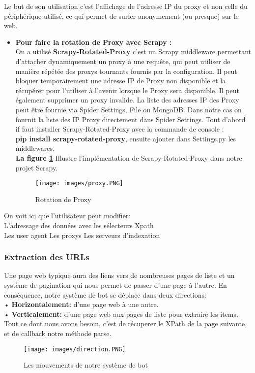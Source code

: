 Le but de son utilisation c'est l'affichage de l'adresse IP du proxy et non celle du périphérique utilisé, ce qui permet de surfer anonymement (ou presque) sur le web.
\newpage
\begin{itemize}[label=,font=\normalsize]
    \addtolength{\itemindent}{0cm}
    \item\textbf{Pour faire la rotation de Proxy avec Scrapy : }\\  
On a utilisé \textbf{Scrapy-Rotated-Proxy} c'est un Scrapy middleware permettant d'attacher dynamiquement un proxy à une requête, qui peut utiliser de manière répétée des proxys tournants fournis par la configuration. Il peut bloquer temporairement une adresse IP de Proxy non disponible et la récupérer pour l'utiliser à l'avenir lorsque le Proxy sera disponible. Il peut également supprimer un proxy invalide. La liste des adresses IP des Proxy peut être fournie via Spider Settings, File ou MongoDB.
Dans notre cas on fournit la liste des IP Proxy directement dans Spider Settings.
Tout d’abord if faut installer Scrapy-Rotated-Proxy avec la commande de console :\\ \textbf{pip install scrapy-rotated-proxy}, ensuite ajouter dans Settings.py les middlewares.\\
\textbf{La figure \ref{fig:rotateProxy}} Illustre l’implémentation de Scrapy-Rotated-Proxy dans notre projet Scrapy.
\begin{figure}[H]
            \centering
            \texttt{[image: images/proxy.PNG]}
            \caption{Rotation de Proxy}
            \label{fig:rotateProxy}  
        \end{figure}
        \end{itemize}
On voit ici que l'utilisateur peut modifier:\\
L'adressage des données avec les sélecteurs Xpath\\
Les user agent
Les proxys
Les serveurs d'indexation

\subsubsection{Extraction des URLs}
Une page web typique aura des liens vers de nombreuses pages de liste et un système de pagination qui nous permet de passer d'une page à l'autre.
En conséquence, notre système de bot se déplace dans deux directions:\\
•  \textbf{Horizontalement:} d'une page web à une autre.\\
• \textbf{Verticalement:} d'une page web aux pages de liste pour extraire les items.\\
Tout ce dont nous avons besoin, c'est de récuperer le  XPath de la page suivante, et de callback notre méthode parse.
\begin{figure}[H]
            \centering
            \texttt{[image: images/direction.PNG]}
            \caption{Les mouvements de notre système de bot \cite{book}}
            \label{fig:Exemple}  
        \end{figure}        

